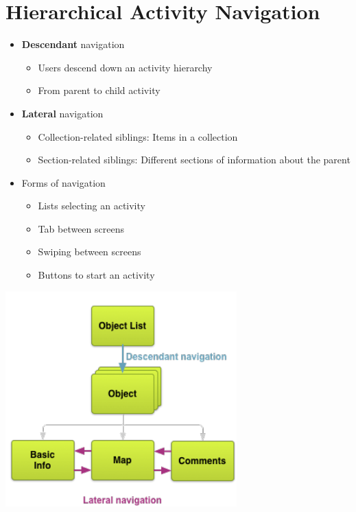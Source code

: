 \documentclass{article}
\begin{document}
\section{Hierarchical	Activity Navigation}

\begin{multicols}{2}
\begin{itemize}
\item \textbf{Descendant} navigation
\begin{itemize}
  \item Users descend down an activity hierarchy
  \item From parent to child activity
\end{itemize}
\item \textbf{Lateral} navigation
\begin{itemize}
  \item Collection-related siblings: Items in a collection
  \item Section-related siblings: Different sections of information about the parent
\end{itemize}
\item Forms	of	navigation
\begin{itemize}
  \item Lists selecting an activity
  \item Tab between screens
  \item Swiping between screens
  \item Buttons to start an activity
\end{itemize}
\end{itemize}

\vfill\null

\includegraphics[scale=0.6]{navigation.png}

\end{multicols}
\end{document}
